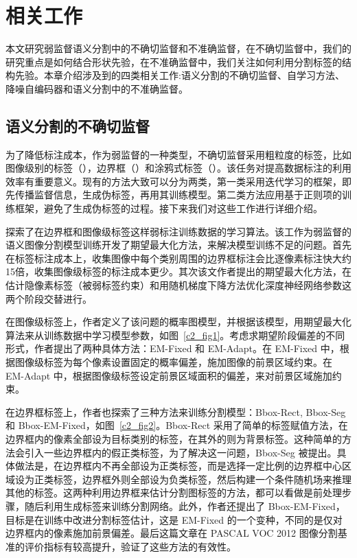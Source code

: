 \chapter{相关工作}
本文研究弱监督语义分割中的不确切监督和不准确监督，在不确切监督中，我们的研究重点是如何结合形状先验，在不准确监督中，我们关注如何利用分割标签的结构先验。本章介绍涉及到的四类相关工作:语义分割的不确切监督、自学习方法、降噪自编码器和语义分割中的不准确监督。

\section{语义分割的不确切监督}
为了降低标注成本，作为弱监督的一种类型，不确切监督采用粗粒度的标签，比如图像级别的标签（\cite{}），边界框（\cite{}）和涂鸦式标签（\cite{}）。该任务对提高数据标注的利用效率有重要意义。现有的方法大致可以分为两类，第一类采用迭代学习的框架，即先传播监督信息，生成伪标签，再用其训练模型。第二类方法应用基于正则项的训练框架，避免了生成伪标签的过程。接下来我们对这些工作进行详细介绍。


\citet{papandreou2015weakly}探索了在边界框和图像级标签这样弱标注训练数据的学习算法。该工作为弱监督的语义图像分割模型训练开发了期望最大化方法，来解决模型训练不足的问题。首先在标签标注成本上，收集图像中每个类别周围的边界框标注会比逐像素标注快大约15倍\citep{lin2014microsoft}，收集图像级标签的标注成本更少。其次该文作者提出的期望最大化方法，在估计隐像素标签（被弱标签约束）和用随机梯度下降方法优化深度神经网络参数这两个阶段交替进行。

在图像级标签上，作者定义了该问题的概率图模型，并根据该模型，用期望最大化算法来从训练数据中学习模型参数，如图~\ref{c2_fig1}。考虑求期望阶段偏差的不同形式，作者提出了两种具体方法：EM-Fixed 和 EM-Adapt。在 EM-Fixed 中，根据图像级标签为每个像素设置固定的概率偏差，施加图像的前景区域约束。在 EM-Adapt 中，根据图像级标签设定前景区域面积的偏差，来对前景区域施加约束。

在边界框标签上，作者也探索了三种方法来训练分割模型：Bbox-Rect, Bbox-Seg 和 Bbox-EM-Fixed，如图~\ref{c2_fig2}。Bbox-Rect 采用了简单的标签赋值方法，在边界框内的像素全部设为目标类别的标签，在其外的则为背景标签。这种简单的方法会引入一些边界框内的假正类标签，为了解决这一问题，Bbox-Seg 被提出。具体做法是，在边界框内不再全部设为正类标签，而是选择一定比例的边界框中心区域设为正类标签，边界框外则全部设为负类标签，然后构建一个条件随机场来推理其他的标签。这两种利用边界框来估计分割图标签的方法，都可以看做是前处理步骤，随后利用生成标签来训练分割网络。此外，作者还提出了 Bbox-EM-Fixed，目标是在训练中改进分割标签估计，这是 EM-Fixed 的一个变种，不同的是仅对边界框内的像素施加前景偏差。最后这篇文章在 PASCAL VOC 2012 图像分割基准的评价指标有较高提升，验证了这些方法的有效性。



